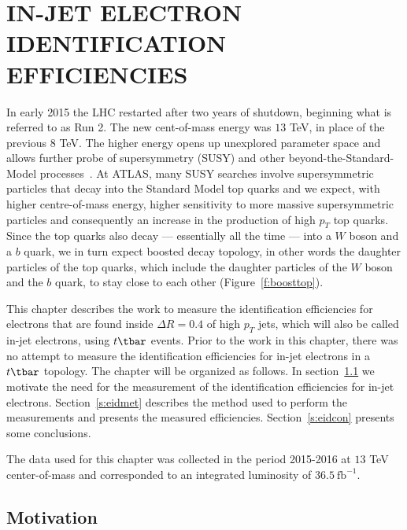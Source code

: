 \chapter{IN-JET ELECTRON IDENTIFICATION EFFICIENCIES}\label{c:eid}

In early 2015 the LHC restarted after two years of shutdown, beginning what is
referred to as Run 2. The new cent-of-mass energy was $13$ TeV, in place of
the previous $8$ TeV. The higher energy opens up unexplored parameter space and
allows further probe of supersymmetry (SUSY) and other
beyond-the-Standard-Model processes~\cite{multib-c7, stop-c7, ttresonance-c7,
	vlq-c7}. At ATLAS, many SUSY searches involve supersymmetric particles that
decay into the Standard Model top quarks and we expect, with higher
centre-of-mass energy, higher sensitivity to more massive supersymmetric
particles and consequently an increase in the production of high $p_T$ top
quarks. Since the top quarks also decay --- essentially all the time --- into a
$W$ boson and a $b$ quark, we in turn expect boosted decay topology, in other
words the daughter particles of the top quarks, which include the daughter
particles of the $W$ boson and the $b$ quark, to stay close to each other
(Figure~\ref{f:boosttop}).



This chapter describes the work to measure the identification efficiencies for
electrons that are found inside $\Delta R = 0.4$ of high $p_T$ jets, which will
also be called in-jet electrons, using $t\tbar$ events. Prior to the work in
this chapter, there was no attempt to measure the identification efficiencies
for in-jet electrons in a $t\tbar$ topology. The chapter will be organized as
follows. In section~\ref{s:eidmot} we motivate the need for the measurement of
the identification efficiencies for in-jet electrons. Section~\ref{s:eidmet}
describes the method used to perform the measurements and presents the measured
efficiencies. Section~\ref{s:eidcon} presents some conclusions.

The data used for this chapter was collected in the period 2015-2016 at $13$
TeV center-of-mass and corresponded to an integrated luminosity of
$36.5~\text{fb}^{-1}$.

\section{Motivation}\label{s:eidmot}

